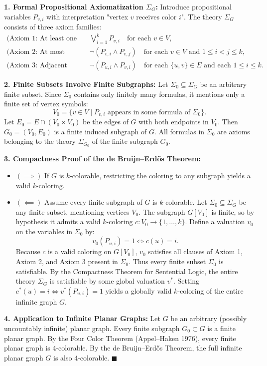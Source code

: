 \begin{solution}
\textbf{1. Formal Propositional Axiomatization $\Sigma_G$:}
Introduce propositional variables $P_{v, i}$ with interpretation "vertex $v$ receives color $i$".
The theory $\Sigma_G$ consists of three axiom families:
\begin{align}
\text{(Axiom 1: At least one color)} &\quad \bigvee_{i=1}^k P_{v, i} \quad \text{for each } v \in V, \\
\text{(Axiom 2: At most one color)} &\quad \neg(P_{v, i} \land P_{v, j}) \quad \text{for each } v \in V \text{ and } 1 \le i < j \le k, \\
\text{(Axiom 3: Adjacent vertices differ)} &\quad \neg(P_{u, i} \land P_{v, i}) \quad \text{for each } \{u, v\} \in E \text{ and each } 1 \le i \le k.
\end{align}

\textbf{2. Finite Subsets Involve Finite Subgraphs:}
Let $\Sigma_0 \subseteq \Sigma_G$ be an arbitrary finite subset.
Since $\Sigma_0$ contains only finitely many formulas, it mentions only a finite set of vertex symbols:
\[
V_0 = \{ v \in V \mid P_{v, i} \text{ appears in some formula of } \Sigma_0 \}.
\]
Let $E_0 = E \cap (V_0 \times V_0)$ be the edges of $G$ with both endpoints in $V_0$.
Then $G_0 = (V_0, E_0)$ is a finite induced subgraph of $G$.
All formulas in $\Sigma_0$ are axioms belonging to the theory $\Sigma_{G_0}$ of the finite subgraph $G_0$.

\textbf{3. Compactness Proof of the de Bruijn--Erd\H{o}s Theorem:}
\begin{itemize}[leftmargin=1.4em,itemsep=2pt]
  \item $(\implies)$ If $G$ is $k$-colorable, restricting the coloring to any subgraph yields a valid $k$-coloring.
  \item $(\impliedby)$ Assume every finite subgraph of $G$ is $k$-colorable.
  Let $\Sigma_0 \subseteq \Sigma_G$ be any finite subset, mentioning vertices $V_0$.
  The subgraph $G[V_0]$ is finite, so by hypothesis it admits a valid $k$-coloring $c: V_0 \to \{1, \dots, k\}$.
  Define a valuation $v_0$ on the variables in $\Sigma_0$ by:
  \[
  v_0(P_{u, i}) = 1 \iff c(u) = i.
  \]
  Because $c$ is a valid coloring on $G[V_0]$, $v_0$ satisfies all clauses of Axiom 1, Axiom 2, and Axiom 3 present in $\Sigma_0$.
  Thus every finite subset $\Sigma_0$ is satisfiable.
  By the Compactness Theorem for Sentential Logic, the entire theory $\Sigma_G$ is satisfiable by some global valuation $v^*$.
  Setting $c^*(u) = i \iff v^*(P_{u, i}) = 1$ yields a globally valid $k$-coloring of the entire infinite graph $G$.
\end{itemize}

\textbf{4. Application to Infinite Planar Graphs:}
Let $G$ be an arbitrary (possibly uncountably infinite) planar graph.
Every finite subgraph $G_0 \subset G$ is a finite planar graph.
By the Four Color Theorem (Appel--Haken 1976), every finite planar graph is 4-colorable.
By the de Bruijn--Erd\H{o}s Theorem, the full infinite planar graph $G$ is also 4-colorable. \hfill $\blacksquare$
\end{solution}

